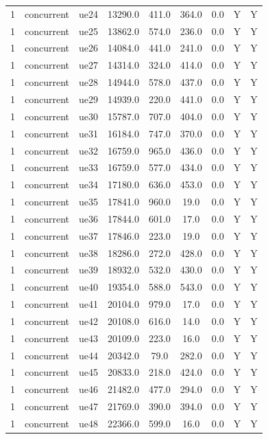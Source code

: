 \begin{table}[ht]
\begin{tabular}{|c|c|c|c|c|c|c|c|c|}
1 & concurrent & ue24 & 13290.0 & 411.0 & 364.0 & 0.0 & Y & Y \\
1 & concurrent & ue25 & 13862.0 & 574.0 & 236.0 & 0.0 & Y & Y \\
1 & concurrent & ue26 & 14084.0 & 441.0 & 241.0 & 0.0 & Y & Y \\
1 & concurrent & ue27 & 14314.0 & 324.0 & 414.0 & 0.0 & Y & Y \\
1 & concurrent & ue28 & 14944.0 & 578.0 & 437.0 & 0.0 & Y & Y \\
1 & concurrent & ue29 & 14939.0 & 220.0 & 441.0 & 0.0 & Y & Y \\
1 & concurrent & ue30 & 15787.0 & 707.0 & 404.0 & 0.0 & Y & Y \\
1 & concurrent & ue31 & 16184.0 & 747.0 & 370.0 & 0.0 & Y & Y \\
1 & concurrent & ue32 & 16759.0 & 965.0 & 436.0 & 0.0 & Y & Y \\
1 & concurrent & ue33 & 16759.0 & 577.0 & 434.0 & 0.0 & Y & Y \\
1 & concurrent & ue34 & 17180.0 & 636.0 & 453.0 & 0.0 & Y & Y \\
1 & concurrent & ue35 & 17841.0 & 960.0 & 19.0 & 0.0 & Y & Y \\
1 & concurrent & ue36 & 17844.0 & 601.0 & 17.0 & 0.0 & Y & Y \\
1 & concurrent & ue37 & 17846.0 & 223.0 & 19.0 & 0.0 & Y & Y \\
1 & concurrent & ue38 & 18286.0 & 272.0 & 428.0 & 0.0 & Y & Y \\
1 & concurrent & ue39 & 18932.0 & 532.0 & 430.0 & 0.0 & Y & Y \\
1 & concurrent & ue40 & 19354.0 & 588.0 & 543.0 & 0.0 & Y & Y \\
1 & concurrent & ue41 & 20104.0 & 979.0 & 17.0 & 0.0 & Y & Y \\
1 & concurrent & ue42 & 20108.0 & 616.0 & 14.0 & 0.0 & Y & Y \\
1 & concurrent & ue43 & 20109.0 & 223.0 & 16.0 & 0.0 & Y & Y \\
1 & concurrent & ue44 & 20342.0 & 79.0 & 282.0 & 0.0 & Y & Y \\
1 & concurrent & ue45 & 20833.0 & 218.0 & 424.0 & 0.0 & Y & Y \\
1 & concurrent & ue46 & 21482.0 & 477.0 & 294.0 & 0.0 & Y & Y \\
1 & concurrent & ue47 & 21769.0 & 390.0 & 394.0 & 0.0 & Y & Y \\
1 & concurrent & ue48 & 22366.0 & 599.0 & 16.0 & 0.0 & Y & Y \\

\end{tabular}
\end{table}
